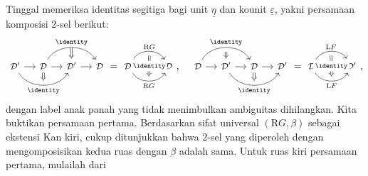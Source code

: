 \begin{bukti}
	Tinggal memeriksa identitas segitiga bagi unit $\underline{\eta}$ dan kounit
	$\underline{\varepsilon}$, yakni persamaan komposisi $2$-sel berikut:
	\begin{equation*}\begin{gathered}
		\begin{tikzcd}[column sep=small, every cell/.append style = {font = \small}]
			\mathcal{D}' \arrow[r] \arrow[bend right=60, rr, "\identity"', "" {name=I}] & \mathcal{D} \arrow[r] \arrow[rr, bend left=60, "\identity", "" {name=J}] \arrow[Rightarrow, to=I] & \mathcal{D}' \arrow[r] \arrow[Rightarrow, from=J] & \mathcal{D}
		\end{tikzcd} = \begin{tikzcd}[every cell/.append style = {font = \small}]
			\mathcal{D}' \arrow[r, bend left=60, "{\mathrm{R}G}", ""' {name=A}] \arrow[r, bend right=60, "{\mathrm{R}G}"', "" {name=B}] & \mathcal{D} \arrow[Rightarrow, from=A, to=B, "\identity" description]
		\end{tikzcd} , \quad
		\begin{tikzcd}[column sep=small, every cell/.append style = {font = \small}]
			\mathcal{D} \arrow[r] \arrow[bend left=60, rr, "\identity", ""' {name=I}] & \mathcal{D}' \arrow[r] \arrow[Rightarrow, from=I] \arrow[bend right=60, rr, "\identity"', "" {name=J}] & \mathcal{D} \arrow[r] \arrow[Rightarrow, to=J] & \mathcal{D}'
		\end{tikzcd} = \begin{tikzcd}[every cell/.append style = {font = \small}]
			\mathcal{D} \arrow[r, bend left=60, "{\mathrm{L}F}", ""' {name=A}] \arrow[r, bend right=60, "{\mathrm{L}F}"', "" {name=B}] & \mathcal{D}' \arrow[Rightarrow, from=A, to=B, "\identity" description]
		\end{tikzcd},
	\end{gathered}\end{equation*}
	dengan label anak panah yang tidak menimbulkan ambiguitas dihilangkan.
	Kita buktikan persamaan pertama. Berdasarkan sifat universal
	$(\mathrm{R}G, \beta)$ sebagai ekstensi Kan kiri, cukup ditunjukkan bahwa
	$2$-sel yang diperoleh dengan mengomposisikan kedua ruas dengan $\beta$
	adalah sama. Untuk ruas kiri persamaan pertama, mulailah dari
	\[\begin{tikzcd}[every cell/.append style = {font = \small}]

\end{tikzcd}\]
\end{bukti}

